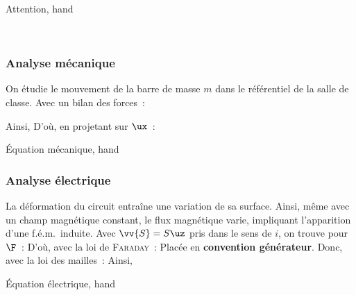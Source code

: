 \documentclass[../main/main.tex]{subfiles}
\begin{document}
\begin{timpo}{Attention, hand}
	\begin{center}
		\danger\
		\danger
	\end{center}
\end{timpo}

\subsubsection{Analyse mécanique}
\label{sssec:rlplmot_anameca}
On étudie le mouvement de la barre de masse $m$ dans le référentiel de la
salle de classe. Avec un bilan des forces~:
\begin{itemize}[label=$\diamond$, leftmargin=10pt]
	 
	 
	 
	 
\end{itemize}
Ainsi,
D'où, en projetant sur $\ux$~:
\begin{tprop}{Équation mécanique, hand}
\end{tprop}

\subsubsection{Analyse électrique}
\label{sssec:rlplmot_anaelec}
La déformation du circuit entraîne une variation de sa surface. Ainsi, même avec
un champ magnétique constant, le flux magnétique varie, impliquant l'apparition
d'une f.é.m.\ induite.
\bigbreak
\noindent
Avec $\vv{S} = S\uz$ pris dans le sens de $i$, on trouve pour $\F$~:
D'où, avec la loi de \textsc{Faraday}~:
Placée en \textbf{convention générateur}. Donc, avec la loi des mailles~:
Ainsi,
\begin{tprop}{Équation électrique, hand}
\end{tprop}
\end{document}
